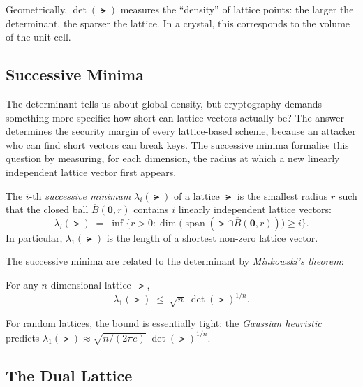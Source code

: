 Geometrically, $\det(\lat)$ measures the ``density'' of lattice points: the larger the determinant, the sparser the lattice.  In a crystal, this corresponds to the volume of the unit cell.


\subsection{Successive Minima}
\label{subsec:successive-minima}

The determinant tells us about global density, but cryptography demands something more specific: how short can lattice vectors actually be?  The answer determines the security margin of every lattice-based scheme, because an attacker who can find short vectors can break keys.  The successive minima formalise this question by measuring, for each dimension, the radius at which a new linearly independent lattice vector first appears.

\begin{definition}
\label{def:successive-minima}
The $i$-th \emph{successive minimum} $\lambda_i(\lat)$ of a lattice $\lat$ is the smallest radius $r$ such that the closed ball $\overline{B}(\mathbf{0}, r)$ contains $i$ linearly independent lattice vectors:
\begin{equation}
\lambda_i(\lat) \;=\; \inf\bigl\{r > 0 : \dim\bigl(\operatorname{span}(\lat \cap \overline{B}(\mathbf{0},r))\bigr) \geq i\bigr\}.
\end{equation}
In particular, $\lambda_1(\lat)$ is the length of a shortest non-zero lattice vector.
\end{definition}

The successive minima are related to the determinant by \emph{Minkowski's theorem}:
\begin{theorem}
\label{thm:minkowski}
For any $n$-dimensional lattice~$\lat$,
\begin{equation}
\label{eq:minkowski}
\lambda_1(\lat) \;\leq\; \sqrt{n}\;\det(\lat)^{1/n}.
\end{equation}
\end{theorem}

For random lattices, the bound is essentially tight: the \emph{Gaussian heuristic} predicts $\lambda_1(\lat) \approx \sqrt{n/(2\pi e)}\;\det(\lat)^{1/n}$.


\subsection{The Dual Lattice}
\label{subsec:dual-lattice}


